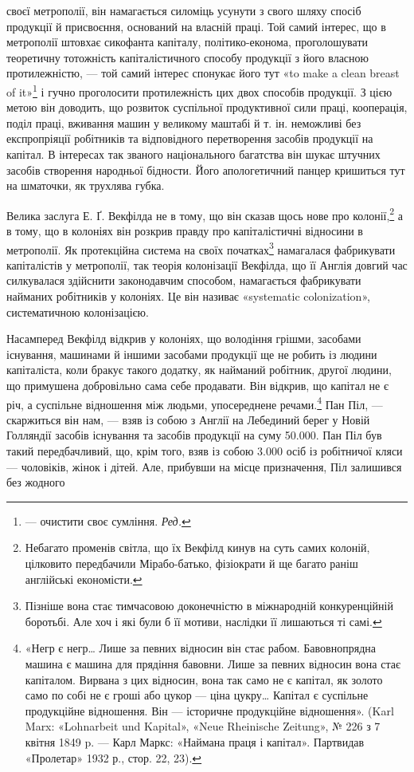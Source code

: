 \parcont{}  %
своєї метрополії, він намагається силоміць усунути з свого шляху спосіб продукції й присвоєння,
оснований на власній праці. Той самий інтерес, що в метрополії штовхає сикофанта капіталу,
політико-економа, проголошувати теоретичну тотожність капіталістичного способу продукції з його
власною протилежністю, — той самий інтерес спонукає його тут «to make a clean breast of it»\footnote*{
— очистити своє сумління. \emph{Ред.}
} і гучно
проголосити протилежність цих двох способів продукції. З цією метою він доводить, що розвиток
суспільної продуктивної сили праці, кооперація, поділ праці, вживання машин у великому маштабі й т.
ін. неможливі без експропріяції робітників та відповідного перетворення засобів продукції на
капітал. В інтересах так званого національного багатства він шукає штучних засобів створення
народньої бідности. Його апологетичний панцер кришиться тут на шматочки, як трухлява губка.

Велика заслуга Е. Ґ. Векфілда не в тому, що він сказав щось нове про колонії,\footnote{
Небагато променів світла, що їх Векфілд кинув на суть самих колоній, цілковито передбачили
Мірабо-батько, фізіократи й ще багато раніш англійські економісти.
} а в тому, що в
колоніях він розкрив правду про капіталістичні відносини в метрополії. Як протекційна система на
своїх початках\footnote{
Пізніше вона стає тимчасовою доконечністю в міжнародній конкуренційній боротьбі. Але хоч і які
були б її мотиви, наслідки її лишаються ті самі.
} намагалася фабрикувати капіталістів
у метрополії, так теорія колонізації Векфілда, що її Англія довгий час силкувалася здійснити
законодавчим способом, намагається фабрикувати найманих робітників у колоніях. Це він називає
«systematic colonization», систематичною колонізацією.

Насамперед Векфілд відкрив у колоніях, що володіння грішми, засобами існування, машинами й іншими
засобами продукції ще не робить із людини капіталіста, коли бракує такого додатку, як найманий
робітник, другої людини, що примушена добровільно сама себе продавати. Він відкрив, що капітал не є
річ, а суспільне відношення між людьми, упосереднене речами.\footnote{
«Негр є негр\dots{} Лише за певних відносин він стає рабом. Бавовнопрядна машина є машина для
прядіння бавовни. Лише за певних відносин вона стає капіталом. Вирвана з цих відносин, вона так само
не є капітал, як золото само по собі не є гроші або цукор — ціна цукру\dots{} Капітал є суспільне
продукційне відношення. Він — історичне продукційне відношення». (Karl Marx: «Lohnarbeit und
Kapital», «Neue Rheinische Zeitung», № 226 з 7 квітня 1849 p. — Карл Маркс: «Наймана праця і
капітал». Партвидав «Пролетар» 1932 р., стор. 22, 23).
} Пан Піл, — скаржиться він нам, —
взяв із собою з Англії на Лебединий берег у Новій Голляндії засобів існування та засобів продукції
на суму \num{50.000}. Пан Піл був такий передбачливий, що, крім того, взяв із собою
\num{3.000} осіб із робітничої кляси — чоловіків, жінок і дітей. Але, прибувши на місце призначення, Піл
залишився без жодного
\parbreak{}  %
